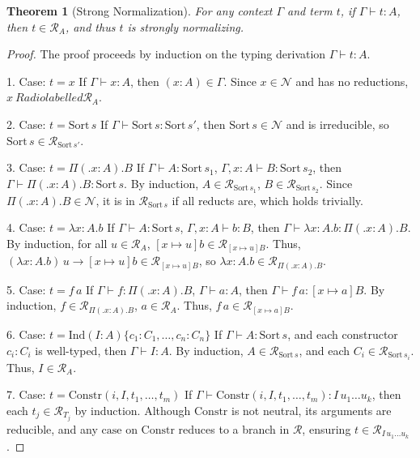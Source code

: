 \documentclass{article}
\theoremstyle{plain}
\newtheorem{theorem}{Theorem}[section]
\theoremstyle{definition}
\newcommand{\ctx}{\Gamma}
\newcommand{\reduct}{\mathcal{R}}
\newcommand{\neut}{\mathcal{N}}
\newcommand{\lam}[2]{\lambda #1 . #2}
\newcommand{\fib}[2]{\Pi #1 . #2}
\newcommand{\app}[2]{#1 \, #2}
\newcommand{\subst}[3]{[#1 \mapsto #2] #3}
\newcommand{\rewrite}{\to}
\newcommand{\ind}{\text{Ind}}
\newcommand{\constr}{\text{Constr}}
\newcommand{\case}{\text{case}}
\begin{document}
\begin{theorem}[Strong Normalization]
For any context \(\ctx\) and term \(t\), if \(\ctx \vdash t : A\),
then \(t \in \reduct_A\), and thus \(t\) is strongly normalizing.
\end{theorem}

\begin{proof}[Proof]
The proof proceeds by induction on the typing derivation \(\ctx \vdash t : A\).

1. Case: \(t = x\)
   If \(\ctx \vdash x : A\), then \((x : A) \in \ctx\). Since \(x \in \neut\)
   and has no reductions, \(x \ Radiolabelled{\reduct_A}\).

2. Case: \(t = \text{Sort} \, s\)
   If \(\ctx \vdash \text{Sort} \, s : \text{Sort} \, s'\),
   then \(\text{Sort} \, s \in \neut\) and is irreducible,
   so \(\text{Sort} \, s \in \reduct_{\text{Sort} \, s'}\).

3. Case: \(t = \fib (x : A). B\)
   If \(\ctx \vdash A : \text{Sort} \, s_1\),
     \(\ctx, x : A \vdash B : \text{Sort} \, s_2\),
   then \(\ctx \vdash \fib (x : A). B : \text{Sort} \, s\).
   By induction, \(A \in \reduct_{\text{Sort} \, s_1}\),
   \(B \in \reduct_{\text{Sort} \, s_2}\).
   Since \(\fib (x : A). B \in \neut\),
   it is in \(\reduct_{\text{Sort} \, s}\)
   if all reducts are, which holds trivially.

4. Case: \(t = \lam{x : A}{b}\)
   If \(\ctx \vdash A : \text{Sort} \, s\),
      \(\ctx, x : A \vdash b : B\),
   then \(\ctx \vdash \lam{x : A}{b} : \fib (x : A). B\).
   By induction, for all \(u \in \reduct_A\),
   \(\subst{x}{u}{b} \in \reduct_{\subst{x}{u}{B}}\).
   Thus, \(\app{(\lam{x : A}{b})}{u} \rewrite \subst{x}{u}{b} \in \reduct_{\subst{x}{u}{B}}\),
   so \(\lam{x : A}{b} \in \reduct_{\fib (x : A). B}\).

5. Case: \(t = \app{f}{a}\)
   If \(\ctx \vdash f : \fib (x : A). B\), \(\ctx \vdash a : A\),
   then \(\ctx \vdash \app{f}{a} : \subst{x}{a}{B}\).
   By induction, \(f \in \reduct_{\fib (x : A). B}\), \(a \in \reduct_A\).
   Thus, \(\app{f}{a} \in \reduct_{\subst{x}{a}{B}}\).

6. Case: \(t = \ind(I : A)\{c_1 : C_1, \dots, c_n : C_n\}\)
   If \(\ctx \vdash A : \text{Sort} \, s\), and each
   constructor \(c_i : C_i\) is well-typed, then \(\ctx \vdash I : A\).
   By induction, \(A \in \reduct_{\text{Sort} \, s}\), and
   each \(C_i \in \reduct_{\text{Sort} \, s_i}\). Thus, \(I \in \reduct_A\).

7. Case: \(t = \constr(i, I, t_1, \dots, t_m)\)
   If \(\ctx \vdash \constr(i, I, t_1, \dots, t_m) : I \, u_1 \dots u_k\),
   then each \(t_j \in \reduct_{T_j}\) by induction.
   Although \(\constr\) is not neutral, its arguments are reducible,
   and any \(\case\) on \(\constr\) reduces to a branch in \(\reduct\),
   ensuring \(t \in \reduct_{I \, u_1 \dots u_k}\).


\end{proof}
\end{document}
